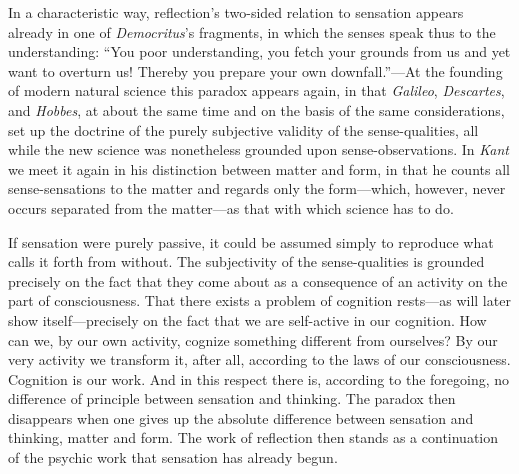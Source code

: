 \documentclass[12pt,a4paper]{book}
\begin{document}
In a characteristic way, reflection's two-sided relation to sensation
appears already in one of \emph{Democritus}'s fragments, in which the
senses speak thus to the understanding: ``You poor understanding, you
fetch your grounds from us and yet want to overturn us! Thereby you
prepare your own downfall.''---At the founding of modern natural science
this paradox appears again, in that \emph{Galileo}, \emph{Descartes}, and
\emph{Hobbes}, at about the same time and on the basis of the same
considerations, set up the doctrine of the purely subjective validity of
the sense-qualities, all while the new science was nonetheless grounded
upon sense-observations. In \emph{Kant} we meet it again in his
distinction between matter and form, in that he counts all sense-sensations
to the matter and regards only the form---which, however, never occurs
separated from the matter---as that with which science has to do.

If sensation were purely passive, it could be assumed simply to reproduce
what calls it forth from without. The subjectivity of the sense-qualities
is grounded precisely on the fact that they come about as a consequence
of an activity on the part of consciousness. That there exists a problem
of cognition rests---as will later show itself---precisely on the fact
that we are self-active in our cognition. How can we, by our own activity,
cognize something different from ourselves? By our very activity we
transform it, after all, according to the laws of our consciousness.
Cognition is our work. And in this respect there is, according to the
foregoing, no difference of principle between sensation and thinking. The
paradox then disappears when one gives up the absolute difference between
sensation and thinking, matter and form. The work of reflection then
stands as a continuation of the psychic work that sensation has already
begun.
\end{document}
